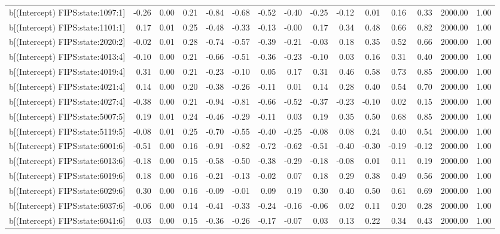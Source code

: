 \begin{table}[ht]
\begin{tabular}{rrrrrrrrrrrrrrr}
  b[(Intercept) FIPS:state:1097:1] & -0.26 & 0.00 & 0.21 & -0.84 & -0.68 & -0.52 & -0.40 & -0.25 & -0.12 & 0.01 & 0.16 & 0.33 & 2000.00 & 1.00 \\ 
  b[(Intercept) FIPS:state:1101:1] & 0.17 & 0.01 & 0.25 & -0.48 & -0.33 & -0.13 & -0.00 & 0.17 & 0.34 & 0.48 & 0.66 & 0.82 & 2000.00 & 1.00 \\ 
  b[(Intercept) FIPS:state:2020:2] & -0.02 & 0.01 & 0.28 & -0.74 & -0.57 & -0.39 & -0.21 & -0.03 & 0.18 & 0.35 & 0.52 & 0.66 & 2000.00 & 1.00 \\ 
  b[(Intercept) FIPS:state:4013:4] & -0.10 & 0.00 & 0.21 & -0.66 & -0.51 & -0.36 & -0.23 & -0.10 & 0.03 & 0.16 & 0.31 & 0.40 & 2000.00 & 1.00 \\ 
  b[(Intercept) FIPS:state:4019:4] & 0.31 & 0.00 & 0.21 & -0.23 & -0.10 & 0.05 & 0.17 & 0.31 & 0.46 & 0.58 & 0.73 & 0.85 & 2000.00 & 1.00 \\ 
  b[(Intercept) FIPS:state:4021:4] & 0.14 & 0.00 & 0.20 & -0.38 & -0.26 & -0.11 & 0.01 & 0.14 & 0.28 & 0.40 & 0.54 & 0.70 & 2000.00 & 1.00 \\ 
  b[(Intercept) FIPS:state:4027:4] & -0.38 & 0.00 & 0.21 & -0.94 & -0.81 & -0.66 & -0.52 & -0.37 & -0.23 & -0.10 & 0.02 & 0.15 & 2000.00 & 1.00 \\ 
  b[(Intercept) FIPS:state:5007:5] & 0.19 & 0.01 & 0.24 & -0.46 & -0.29 & -0.11 & 0.03 & 0.19 & 0.35 & 0.50 & 0.68 & 0.85 & 2000.00 & 1.00 \\ 
  b[(Intercept) FIPS:state:5119:5] & -0.08 & 0.01 & 0.25 & -0.70 & -0.55 & -0.40 & -0.25 & -0.08 & 0.08 & 0.24 & 0.40 & 0.54 & 2000.00 & 1.00 \\ 
  b[(Intercept) FIPS:state:6001:6] & -0.51 & 0.00 & 0.16 & -0.91 & -0.82 & -0.72 & -0.62 & -0.51 & -0.40 & -0.30 & -0.19 & -0.12 & 2000.00 & 1.00 \\ 
  b[(Intercept) FIPS:state:6013:6] & -0.18 & 0.00 & 0.15 & -0.58 & -0.50 & -0.38 & -0.29 & -0.18 & -0.08 & 0.01 & 0.11 & 0.19 & 2000.00 & 1.00 \\ 
  b[(Intercept) FIPS:state:6019:6] & 0.18 & 0.00 & 0.16 & -0.21 & -0.13 & -0.02 & 0.07 & 0.18 & 0.29 & 0.38 & 0.49 & 0.56 & 2000.00 & 1.00 \\ 
  b[(Intercept) FIPS:state:6029:6] & 0.30 & 0.00 & 0.16 & -0.09 & -0.01 & 0.09 & 0.19 & 0.30 & 0.40 & 0.50 & 0.61 & 0.69 & 2000.00 & 1.00 \\ 
  b[(Intercept) FIPS:state:6037:6] & -0.06 & 0.00 & 0.14 & -0.41 & -0.33 & -0.24 & -0.16 & -0.06 & 0.02 & 0.11 & 0.20 & 0.28 & 2000.00 & 1.00 \\ 
  b[(Intercept) FIPS:state:6041:6] & 0.03 & 0.00 & 0.15 & -0.36 & -0.26 & -0.17 & -0.07 & 0.03 & 0.13 & 0.22 & 0.34 & 0.43 & 2000.00 & 1.00 \\ 

\end{tabular}
\end{table}

